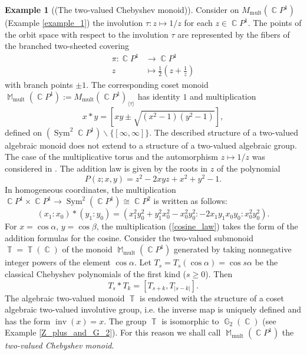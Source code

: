 \documentclass[14pt, dvipsnames]{extarticle}
\theoremstyle{plain}
\theoremstyle{definition}
\newtheorem{example}{\bf Example}
\theoremstyle{remark}
\DeclareMathOperator{\Tt}{\mathbb{T}}
\DeclareMathOperator{\G}{\mathbb{G}}
\DeclareMathOperator{\Sym}{\mathrm{Sym}}
\DeclareMathOperator{\inv}{\mathrm{inv}}
\DeclareMathOperator{\Cc}{\mathbb{C}}
\DeclareMathOperator{\M}{\mathbb{M}}
\DeclareMathOperator{\mult}{\mathrm{mult}}
\begin{document}
\begin{example}[(The two-valued Chebyshev monoid)]\label{Chebyshev}
Consider on $M_{\mult}(\Cc\!P^1)$ (Example \ref{example_1}) the involution $\tau: z\mapsto 1/z$ for each $z\in \Cc\!P^1$. The points of the orbit space with respect to the involution $\tau$ are represented by the fibers of the branched two-sheeted covering
\begin{equation}\label{cheb_projection}
\begin{aligned}
\pi: \Cc\!P^1&\to \Cc\!P^1\\
z&\mapsto\frac{1}{2}\left(z + \frac{1}{z}\right)
\end{aligned}
\end{equation}
with branch points $\pm 1$. The corresponding coset monoid $\M_{\mult}(\Cc\!P^1) := M_{\mult}(\Cc\!P^1)_{\langle \tau \rangle}$ has identity $1$ and multiplication
\begin{equation}\label{cosine_law}
x\ast y = \left[xy \pm\sqrt{(x^2 - 1)(y^2 - 1)}\right],
\end{equation}
defined on $(\Sym^2\Cc\!P^1)\backslash\{[\infty, \infty]\}$. The described structure of a two-valued algebraic monoid does not extend to a structure of a two-valued algebraic group. The case of the multiplicative torus and the automorphism $z\mapsto 1/z$ was considered in \cite[Section 7, Example 3]{Buchstaber}. The addition law is given by the roots in $z$ of the polynomial
$$P(z; x, y) = z^2 - 2xy z + x^2 + y^2 -1.$$
In homogeneous coordinates, the multiplication $\Cc\!P^1\times \Cc\!P^1\to\Sym^2(\Cc\!P^1)\cong \Cc\!P^2$ is written as follows:
$$(x_1:x_0)\ast(y_1:y_0) = (x_1^2y_0^2+y_1^2x_0^2-x_0^2y_0^2: -2x_1y_1x_0y_0: x_0^2y_0^2).$$
For $x = \cos\alpha$, $y = \cos\beta$, the multiplication (\ref{cosine_law}) takes the form of the addition formulas for the cosine. Consider the two-valued submonoid $\Tt = \Tt(\Cc)$ of the monoid $\M_{\mult}(\Cc\!P^1)$ generated by taking nonnegative integer powers of the element $\cos\alpha$. Let $T_s = T_s(\cos\alpha) = \cos s\alpha$ be the classical Chebyshev polynomials of the first kind ($s\geqslant 0$). Then
$$T_s\ast T_k = [T_{s+k}, T_{|s - k|}].$$
{The algebraic two-valued monoid $\Tt$ is endowed with the structure of a coset algebraic two-valued involutive group, i.e. the inverse map is uniquely defined and has the form $\inv(x) = x$. The group $\Tt$ is isomorphic to $\G_2(\Cc)$ (see Example \ref{Z_plus_and_G_2}). For this reason we shall call $\M_{\mult}(\Cc\!P^1)$ the {\it two-valued Chebyshev monoid}.}    
\end{example}
\end{document}
